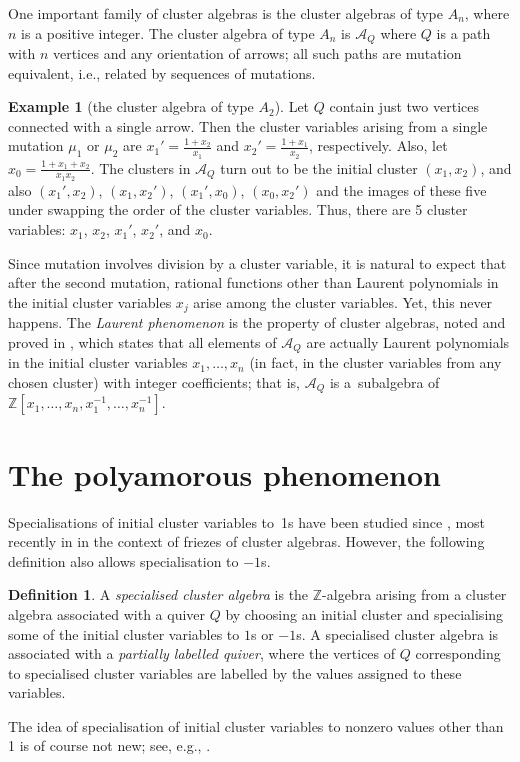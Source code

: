 \documentclass[12pt]{article}
\theoremstyle{definition}
\newtheorem{definition}{Definition}
\newtheorem{example}{Example}
\newcommand{\Z}{\mathbb{Z}}
\begin{document}
One important family of cluster algebras is the cluster algebras of type $A_n$, where $n$ is a positive integer. The cluster algebra of type $A_n$ is $\mathcal{A}_Q$ where $Q$ is a path with $n$ vertices and any orientation of arrows; all such paths are mutation equivalent, i.e., related by sequences of mutations.
\begin{example}[the cluster algebra of type $A_2$]
\label{ex:a2}
Let $Q$ contain just two vertices connected with a single arrow. Then the cluster variables arising from a single mutation $\mu_1$ or $\mu_2$ are  $x_1' = \tfrac{1+x_2}{x_1}$ and $x_2'=\tfrac{1+x_1}{x_2}$, respectively. Also, let $x_0=\tfrac{1+x_1+x_2}{x_1x_2}$. The clusters in $\mathcal{A}_Q$ turn out to be the initial cluster $(x_1,x_2)$, and also $(x_1',x_2)$, $(x_1,x_2')$, $(x_1', x_0)$, $(x_0,x_2')$ and the images of these five under swapping the order of the cluster variables. Thus, there are 5 cluster variables: $x_1$, $x_2$, $x_1'$, $x_2'$, and $x_0$.
\end{example}

Since mutation involves division by a cluster variable, it is natural to expect that after the second mutation, rational functions other than Laurent polynomials in the initial cluster variables $x_j$ arise among the cluster variables. Yet, this never happens. The \emph{Laurent phenomenon} is the property of cluster algebras, noted and proved in \cite{CA1}, which states that all elements of $\mathcal{A}_Q$ are actually Laurent polynomials in the initial cluster variables $x_1,\ldots,x_n$ (in fact, in the cluster variables from any chosen cluster) with integer coefficients; that is, $\mathcal{A}_Q$ is a~subalgebra of $\Z[x_1,\ldots,x_n,x_1^{-1},\ldots,x_n^{-1}]$.


\section{The polyamorous phenomenon}
\label{sec:poly}

Specialisations of initial cluster variables to~1s have been studied since \cite{CA4}, most recently in \cite[Section 4.2]{AdSGFriezes} in the context of friezes of cluster algebras.
However, the following definition also allows specialisation to $-1$s.

\begin{definition}
\label{def:spec}
A \emph{specialised cluster algebra} is the $\Z$-algebra arising from a cluster algebra associated with a quiver $Q$ 
by choosing an initial cluster and specialising some of the initial cluster variables  to $1$s or $-1$s.
A specialised cluster algebra is associated with a \emph{partially labelled quiver}, where the vertices of $Q$ corresponding to specialised cluster variables are labelled by the values assigned to these variables.
\end{definition}
The idea of specialisation of initial cluster variables to nonzero values other than 1 is of course not new; see, e.g., \cite[Section 5]{CuntzHolmFriezes}.
\end{document}
